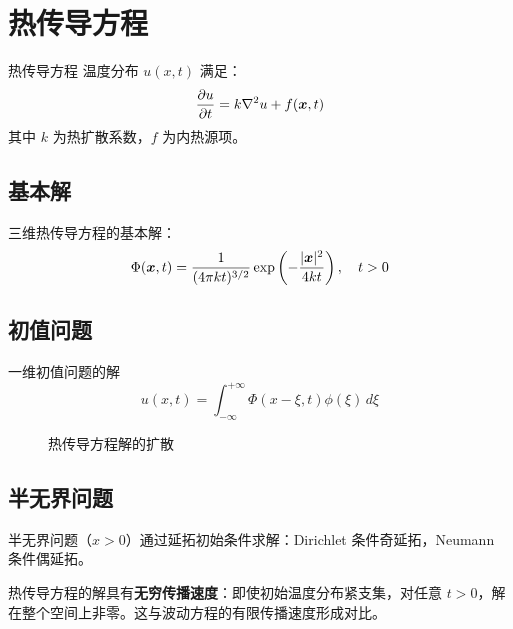 ﻿\chapter{热传导方程}

\begin{mydefinition}{热传导方程}
温度分布 $u(x,t)$ 满足：
\[
\frac{\partial u}{\partial t}=k\nabla^2 u+f(\boldsymbol{x},t)
\]
其中 $k$ 为热扩散系数，$f$ 为内热源项。
\end{mydefinition}

\section{基本解}

\begin{theorem}[热核]
三维热传导方程的基本解：
\[
\Phi(\boldsymbol{x},t)=\frac{1}{(4\pi kt)^{3/2}}\exp\left(-\frac{|\boldsymbol{x}|^2}{4kt}\right),\quad t>0
\]
\end{theorem}

\section{初值问题}

\begin{mydefinition}{一维初值问题的解}
\[
u(x,t)=\int_{-\infty}^{+\infty}\Phi(x-\xi,t)\phi(\xi)\,d\xi
\]
\end{mydefinition}

\begin{figure}[htbp]
\centering
{}
\caption{热传导方程解的扩散}
\end{figure}

\section{半无界问题}

\begin{theorem}[镜像法]
半无界问题（$x>0$）通过延拓初始条件求解：Dirichlet 条件奇延拓，Neumann 条件偶延拓。
\end{theorem}

\begin{remark}
热传导方程的解具有\textbf{无穷传播速度}：即使初始温度分布紧支集，对任意 $t>0$，解在整个空间上非零。这与波动方程的有限传播速度形成对比。
\end{remark}
